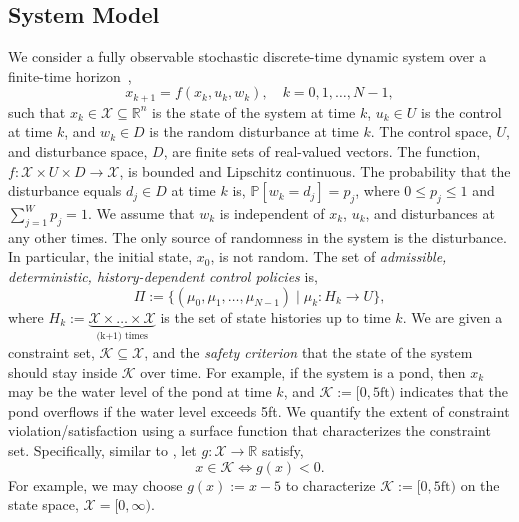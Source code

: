 \documentclass[letterpaper, 10 pt, conference]{ieeeconf}  %
\begin{document}
\subsection{System Model}
We consider a fully observable stochastic discrete-time dynamic system over a finite-time horizon~\cite[Sec. 1.2]{bertsekas2005dynamic},
\begin{equation}
x_{k+1} = f(x_k,u_k,w_k), \quad k = 0, 1, \dots, N-1,
\label{sys}
\end{equation}
such that $x_k \in \mathcal{X} \subseteq \mathbb{R}^n$ is the state of the system at time $k$,
$u_k \in U$ is the control at time $k$, and
$w_k \in D$ is the random disturbance at time $k$. The control space, $U$, and disturbance space, $D$, are finite sets of real-valued vectors.
The function, $f : \mathcal{X} \times U \times D \rightarrow \mathcal{X}$, is bounded and Lipschitz continuous.
The probability that the disturbance equals $d_j \in D$ at time $k$ is, $\mathbb{P}[w_k = d_j] = p_j$, 
where $0 \leq p_j \leq 1$ and $\sum_{j=1}^W p_j = 1$. We assume that $w_k$ is independent of $x_k$, $u_k$, and disturbances at any other times.  
The only source of randomness in the system is the disturbance.
In particular, the initial state, $x_0$, is not random. 
The set of \textit{admissible, deterministic, history-dependent control policies} is,
%
\begin{equation}
\Pi := \big\{ (\mu_0, \mu_1, \dots, \mu_{N-1}) \mid \mu_k: H_k \rightarrow U \big\},
\label{pi}
\end{equation}
%
where $H_k := \underbrace{\mathcal{X} \times \hdots \times \mathcal{X}}_{\text{(k+1) times}}$ is the set of state histories up to time $k$.
We are given a constraint set, $\mathcal{K} \subseteq \mathcal{X}$, and the \textit{safety criterion} that 
the state of the system should stay inside $\mathcal{K}$ over time. 
For example, if the system is a pond, then $x_k$ may be the water level of the pond at time $k$,
and $\mathcal{K} := [0, 5\text{ft})$ indicates that the pond overflows if the water level exceeds 5ft.
We quantify the extent of constraint violation/satisfaction using a surface function that characterizes the constraint set.
Specifically, similar to \cite[Eq. 2.3]{EECS-2018-41}, let $g: \mathcal{X} \rightarrow \mathbb{R}$ satisfy,
%
\begin{equation}
x \in \mathcal{K} \iff g(x) < 0.
\label{g}
\end{equation}
%
For example, we may choose $g(x) := x - 5$ to characterize $\mathcal{K} := [0, 5\text{ft})$ on the state space, 
$\mathcal{X} = [0, \infty)$.
\end{document}
